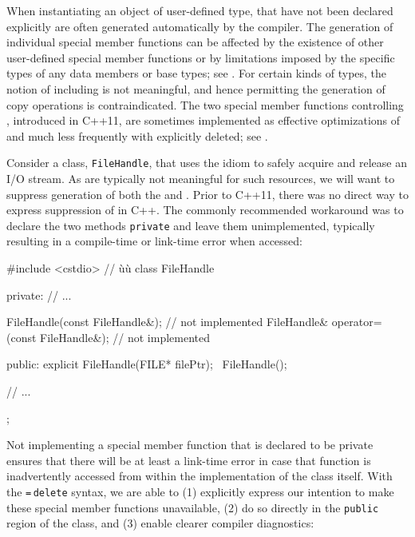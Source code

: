 When instantiating an object of user-defined type,  that have not been declared explicitly are
often generated automatically by the compiler.
The generation of individual special member
functions can be affected by the existence of other user-defined special
member functions or by limitations imposed by the specific types of
any data members or base types; see
. For certain kinds of types, the notion of 
including  is not meaningful, and
hence permitting the generation of copy operations is contraindicated. The two special member functions controlling , introduced in C++11, are sometimes implemented as effective optimizations of  and much less frequently with  explicitly deleted; see .

Consider a class, \lstinline!FileHandle!, that uses the  idiom
to safely acquire and release an I/O stream. As 
are typically not meaningful for such resources, we will want to
suppress generation of both the  and . Prior to C++11, there was no direct way to express
suppression of  in C++. The commonly
recommended workaround was to declare the two methods \lstinline!private!
and leave them unimplemented, typically resulting in a compile-time or
link-time error when accessed:

\begin{emcppslisting}
#include <cstdio>  // ù{}ù
class FileHandle
{
private:
    // ...

    FileHandle(const FileHandle&);             // not implemented
    FileHandle& operator=(const FileHandle&);  // not implemented

public:
    explicit FileHandle(FILE* filePtr);
    ~FileHandle();

    // ...
};
\end{emcppslisting}

\noindent Not implementing a special member function that is declared to be private ensures that there will be at least a link-time error in case that function is inadvertently accessed from within the implementation of the class itself. With the \lstinline!=!\,\lstinline!delete! syntax, we are able to (1)
explicitly express our intention to make these special member
functions unavailable, (2) do so directly in the \lstinline!public! region
of the class, and (3) enable clearer compiler diagnostics:

